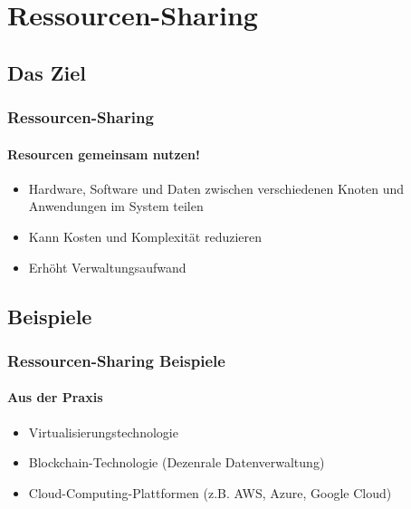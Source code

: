 \section{Ressourcen-Sharing}
\subsection{Das Ziel}
\begin{frame}
  \frametitle{Ressourcen-Sharing}
  \framesubtitle{Resourcen gemeinsam nutzen!}
  \begin{itemize}
    \item Hardware, Software und Daten zwischen verschiedenen Knoten und Anwendungen im System teilen
    \item Kann Kosten und Komplexität reduzieren 
    \item Erhöht Verwaltungsaufwand
  \end{itemize}
\end{frame}

\subsection{Beispiele}
\begin{frame}
  \frametitle{Ressourcen-Sharing Beispiele}
  \framesubtitle{Aus der Praxis}
  \begin{itemize}
    \item Virtualisierungstechnologie
    \item Blockchain-Technologie (Dezenrale Datenverwaltung)
    \item Cloud-Computing-Plattformen (z.B. AWS, Azure, Google Cloud)
  \end{itemize}
\end{frame}
